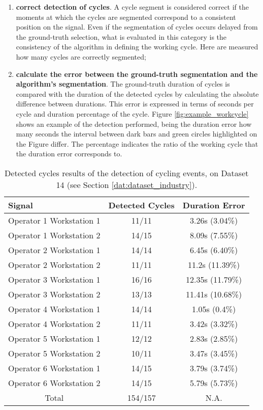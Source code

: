 \begin{enumerate}

\item \textbf{correct detection of cycles}. A cycle segment is considered correct if the moments at which the cycles are segmented correspond to a consistent position on the signal. Even if the segmentation of cycles occurs delayed from the ground-truth selection, what is evaluated in this category is the consistency of the algorithm in defining the working cycle. Here are measured how many cycles are correctly segmented;

\item \textbf{calculate the error between the ground-truth segmentation and the algorithm's segmentation}. The ground-truth duration of cycles is compared with the duration of the detected cycles by calculating the absolute difference between durations. This error is expressed in terms of seconds per cycle and duration percentage of the cycle. Figure \ref{fig:example_workcycle} shows an example of the detection performed, being the duration error how many seconds the interval between dark bars and green circles highlighted on the Figure differ. The percentage indicates the ratio of the working cycle that the duration error corresponds to. 

\end{enumerate}

\begin{table}
\centering
\caption{Detected cycles results of the detection of cycling events, on Dataset 14 (see Section \ref{dat:dataset_industry}).}
\label{tab:wc_results}
\begin{tabular}{lcc} 
\toprule
Signal & Detected Cycles & Duration Error\\ 
\midrule
Operator 1 Workstation 1 & 11/11 & 3.26s (3.04\%)\\
Operator 1 Workstation 2 & 14/15 & 8.09s (7.55\%)\\
Operator 2 Workstation 1 & 14/14 & 6.45s (6.40\%)\\
Operator 2 Workstation 2 & 11/11 & 11.2s (11.39\%)\\
Operator 3 Workstation 1 & 16/16 & 12.35s (11.79\%)\\
Operator 3 Workstation 2 & 13/13 & 11.41s (10.68\%)\\
Operator 4 Workstation 1 & 14/14 & 1.05s (0.4\%)\\
Operator 4 Workstation 2 & 11/11 & 3.42s (3.32\%)\\
Operator 5 Workstation 1 & 12/12 & 2.83s (2.85\%)\\
Operator 5 Workstation 2 & 10/11 & 3.47s (3.45\%)\\
Operator 6 Workstation 1 & 14/15 & 3.79s (3.74\%)\\
Operator 6 Workstation 2 & 14/15 & 5.79s (5.73\%)\\
\midrule
\multicolumn{1}{c}{Total} & 154/157 & N.A.\\
\bottomrule
\end{tabular}
\end{table}



